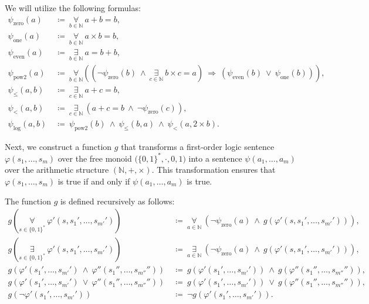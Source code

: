 \documentclass[12pt]{article}
\begin{document}
	We will utilize the following formulas:
	\begin{align*}
		\psi_{\text{zero}}(a) \ &\coloneqq \ \underset{b \in \mathbb{N}}
		{\forall} \ a + b = b \text{,} \\
		\psi_{\text{one}}(a) \ &\coloneqq \ \underset{b \in \mathbb{N}}{\forall}
		\ a \times b = b \text{,} \\
		\psi_{\text{even}}(a) \ &\coloneqq \ \underset{b \in \mathbb{N}}
		{\exists} \ a = b + b \text{,} \\
		\psi_{\text{pow2}}(a) \ &\coloneqq \ \underset{b \in \mathbb{N}}
		{\forall} \left( \left( \neg \psi_{\text{zero}}(b) \ \wedge \
		\underset{c \in \mathbb{N}}{\exists} \ b \times c = a \right) \
		\Rightarrow \ (\psi_{\text{even}}(b) \ \vee \ \psi_{\text{one}}(b))
		\right) \text{,} \\
		\psi_{\leqslant}(a, b) \ &\coloneqq \ \underset{c \in \mathbb{N}}
		{\exists} \ a + c = b \text{,} \\
		\psi_{<}(a, b) \ &\coloneqq \ \underset{c \in \mathbb{N}}{\exists} \ (a
		+ c = b \ \wedge \ \neg \psi_{\text{zero}}(c)) \text{,} \\
		\psi_{\text{log}}(a, b) \ &\coloneqq \ \psi_{\text{pow2}}(b) \ \wedge \
		\psi_{\leqslant}(b, a) \ \wedge \ \psi_{<}(a, 2 \times b) \text{.}
	\end{align*}
	
	Next, we construct a function \(g\) that transforms a first-order logic
	sentence \(\varphi(s_{1}, \ldots, s_{m})\) over the free monoid
	\(\big(\{0, 1\}^{\ast}, \cdot, 0, 1 \big)\) into a sentence \(\psi(a_{1},
	\ldots, a_{m})\) over the arithmetic structure \((\mathbb{N}, +, \times)\).
	This transformation ensures that \(\varphi(s_{1}, \ldots, s_{m})\) is true
	if and only if \(\psi(a_{1}, \ldots, a_{m})\) is true.
	
	\medskip
	
	The function \(g\) is defined recursively as follows:
	\begin{align*}
		g \left( \underset{s \in \{0, 1\}^{\ast}}{\forall} \ \varphi'(s, s_{1}',
		\ldots, s_{m'}') \right) \ &\coloneqq \ \underset{a \in \mathbb{N}}
		{\forall} \ (\neg \psi_{\text{zero}}(a) \ \wedge \ g(\varphi'(s, s_{1}',
		\ldots, s_{m'}'))) \text{,} \\[0.2 cm]
		g \left( \underset{s \in \{0, 1\}^{\ast}}{\exists} \ \varphi'(s, s_{1}',
		\ldots, s_{m'}') \right) \ &\coloneqq \ \underset{a \in \mathbb{N}}
		{\exists} \ (\neg \psi_{\text{zero}}(a) \ \wedge \ g(\varphi'(s, s_{1}',
		\ldots, s_{m'}'))) \text{,} \\[0.2 cm]
		g(\varphi'(s_{1}', \ldots, s_{m'}') \ \wedge \ \varphi''(s_{1}'',
		\ldots, s_{m''}'')) \ &\coloneqq \ g(\varphi'(s_{1}', \ldots, s_{m'}'))
		\ \wedge \ g(\varphi''(s_{1}'', \ldots, s_{m''}'')) \text{,} \\[0.2 cm]
		g(\varphi'(s_{1}', \ldots, s_{m'}') \ \vee \ \varphi''(s_{1}'', \ldots,
		s_{m''}'')) \ &\coloneqq \ g(\varphi'(s_{1}', \ldots, s_{m'}')) \ \vee \
		g(\varphi''(s_{1}'', \ldots, s_{m''}'')) \text{,} \\[0.2 cm]
		g(\neg \varphi'(s_{1}', \ldots, s_{m'}')) \ &\coloneqq \ \neg
		g(\varphi'(s_{1}', \ldots, s_{m'}')) \text{.}
	\end{align*}
	
\end{document}
